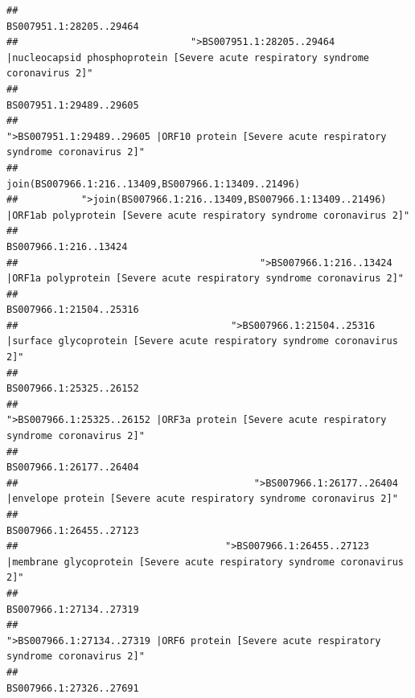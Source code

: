 \documentclass[
]{article}
\begin{document}
\begin{verbatim}
##                                                                                                                BS007951.1:28205..29464 
##                              ">BS007951.1:28205..29464 |nucleocapsid phosphoprotein [Severe acute respiratory syndrome coronavirus 2]" 
##                                                                                                                BS007951.1:29489..29605 
##                                            ">BS007951.1:29489..29605 |ORF10 protein [Severe acute respiratory syndrome coronavirus 2]" 
##                                                                                    join(BS007966.1:216..13409,BS007966.1:13409..21496) 
##           ">join(BS007966.1:216..13409,BS007966.1:13409..21496) |ORF1ab polyprotein [Severe acute respiratory syndrome coronavirus 2]" 
##                                                                                                                  BS007966.1:216..13424 
##                                          ">BS007966.1:216..13424 |ORF1a polyprotein [Severe acute respiratory syndrome coronavirus 2]" 
##                                                                                                                BS007966.1:21504..25316 
##                                     ">BS007966.1:21504..25316 |surface glycoprotein [Severe acute respiratory syndrome coronavirus 2]" 
##                                                                                                                BS007966.1:25325..26152 
##                                            ">BS007966.1:25325..26152 |ORF3a protein [Severe acute respiratory syndrome coronavirus 2]" 
##                                                                                                                BS007966.1:26177..26404 
##                                         ">BS007966.1:26177..26404 |envelope protein [Severe acute respiratory syndrome coronavirus 2]" 
##                                                                                                                BS007966.1:26455..27123 
##                                    ">BS007966.1:26455..27123 |membrane glycoprotein [Severe acute respiratory syndrome coronavirus 2]" 
##                                                                                                                BS007966.1:27134..27319 
##                                             ">BS007966.1:27134..27319 |ORF6 protein [Severe acute respiratory syndrome coronavirus 2]" 
##                                                                                                                BS007966.1:27326..27691 

\end{verbatim}
\end{document}
